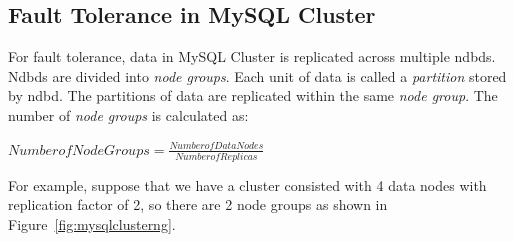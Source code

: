 \subsection{Fault Tolerance in MySQL Cluster}

\noindent For fault tolerance, data in MySQL Cluster is replicated across multiple ndbds. Ndbds are divided into \textit{node groups}. Each unit of data is called a \textit{partition} stored by ndbd. The partitions of data are replicated within the same \textit{node group}. The number of \textit{node groups} is calculated as:

\begin{center}
	$Number of Node Groups = \frac{Number of Data Nodes}{Number of Replicas}$
\end{center}

\noindent For example, suppose that we have a cluster consisted with 4 data nodes with replication factor of 2, so there are 2 node groups as shown in Figure~\ref{fig:mysqlclusterng}.

